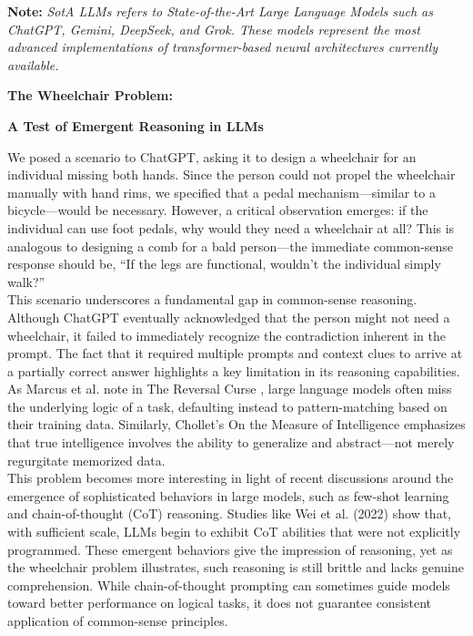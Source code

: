 \documentclass[11pt]{scrartcl}
\begin{document}
\vspace{2em}
\noindent\textbf{Note:} \textit{SotA LLMs refers to State-of-the-Art Large Language Models such as ChatGPT, Gemini, DeepSeek, and Grok. These models represent the most advanced implementations of transformer-based neural architectures currently available.}

\vspace{1em}

\begin{huge}
\textbf{The Wheelchair Problem:}
\end{huge}
\begin{large}
\textbf{A Test of Emergent Reasoning in LLMs}
\end{large}
We posed a scenario to ChatGPT, asking it to design a wheelchair for an individual missing both hands. Since the person could not propel the wheelchair manually with hand rims, we specified that a pedal mechanism—similar to a bicycle—would be necessary. However, a critical observation emerges: if the individual can use foot pedals, why would they need a wheelchair at all? This is analogous to designing a comb for a bald person—the immediate common-sense response should be, “If the legs are functional, wouldn’t the individual simply walk?”\\

This scenario underscores a fundamental gap in common-sense reasoning. Although ChatGPT eventually acknowledged that the person might not need a wheelchair, it failed to immediately recognize the contradiction inherent in the prompt. The fact that it required multiple prompts and context clues to arrive at a partially correct answer highlights a key limitation in its reasoning capabilities. As Marcus et al. note in The Reversal Curse \cite{ref1}, large language models often miss the underlying logic of a task, defaulting instead to pattern-matching based on their training data. Similarly, Chollet’s On the Measure of Intelligence \cite{ref3} emphasizes that true intelligence involves the ability to generalize and abstract—not merely regurgitate memorized data.\\

This problem becomes more interesting in light of recent discussions around the emergence of sophisticated behaviors in large models, such as few-shot learning and chain-of-thought (CoT) reasoning. Studies like Wei et al. (2022) \cite{ref12} show that, with sufficient scale, LLMs begin to exhibit CoT abilities that were not explicitly programmed. These emergent behaviors give the impression of reasoning, yet as the wheelchair problem illustrates, such reasoning is still brittle and lacks genuine comprehension. While chain-of-thought prompting can sometimes guide models toward better performance on logical tasks, it does not guarantee consistent application of common-sense principles.\\
\end{document}
